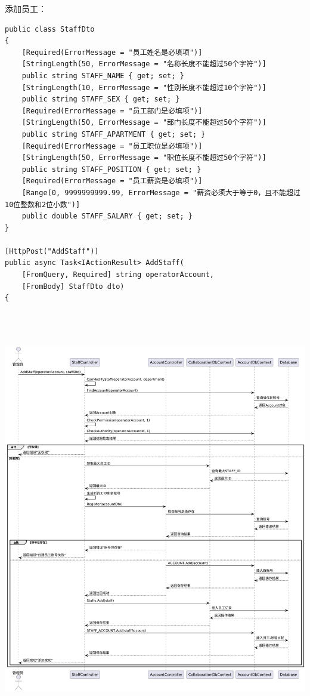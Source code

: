 \documentclass[]{article}
\begin{document}
添加员工：
\begin{verbatim}
public class StaffDto
{
    [Required(ErrorMessage = "员工姓名是必填项")]
    [StringLength(50, ErrorMessage = "名称长度不能超过50个字符")]
    public string STAFF_NAME { get; set; }
    [StringLength(10, ErrorMessage = "性别长度不能超过10个字符")]
    public string STAFF_SEX { get; set; }
    [Required(ErrorMessage = "员工部门是必填项")]
    [StringLength(50, ErrorMessage = "部门长度不能超过50个字符")]
    public string STAFF_APARTMENT { get; set; }
    [Required(ErrorMessage = "员工职位是必填项")]
    [StringLength(50, ErrorMessage = "职位长度不能超过50个字符")]
    public string STAFF_POSITION { get; set; }
    [Required(ErrorMessage = "员工薪资是必填项")]
    [Range(0, 9999999999.99, ErrorMessage = "薪资必须大于等于0，且不能超过10位整数和2位小数")]
    public double STAFF_SALARY { get; set; }
}

[HttpPost("AddStaff")]
public async Task<IActionResult> AddStaff(
    [FromQuery, Required] string operatorAccount,
    [FromBody] StaffDto dto)
{
\end{verbatim}

\includegraphics[width=6.27778in,height=7.20903in]{media/media/image15.png}
\end{document}
